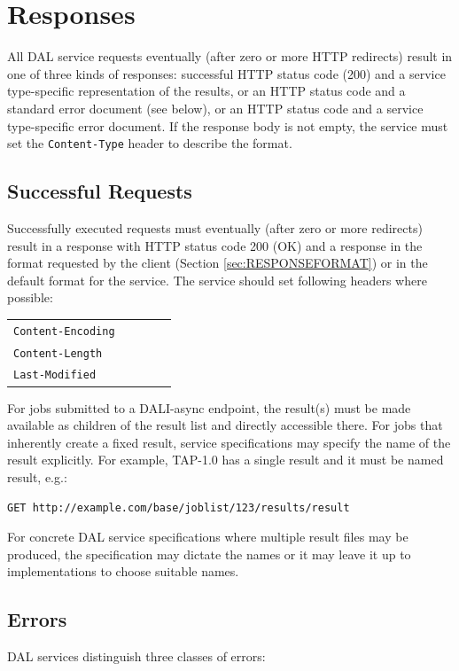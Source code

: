 \documentclass[11pt,letter]{ivoa}
\begin{document}
\section{Responses}
\label{sec:responses}
All DAL service requests eventually (after zero or more HTTP redirects) result
in one of three kinds of responses:
successful HTTP status code (200) and a service type-specific
representation of the results, or an HTTP status code and a standard error
document (see below), or an HTTP status code and a service type-specific
error document. If the response body is not empty, the service must set the
\verb|Content-Type| header \citep{std:HTTP} to describe the format.

\subsection{Successful Requests}
\label{sec:response-ok}
Successfully executed requests must eventually (after zero or more redirects)
result in a response with HTTP status code 200 (OK) and a response in the format
requested by the client (Section \ref{sec:RESPONSEFORMAT}) or in the default format for the
service. The service should set following headers where possible:

\begin{tabular}{l l l l l}
\label{tab:headers}
\verb|Content-Encoding| \\
\verb|Content-Length| \\
\verb|Last-Modified| \\
\end{tabular}

For jobs submitted to a DALI-async endpoint, the result(s) must be made
available as children of the result list and directly accessible there.
For jobs that inherently create a fixed result, service specifications may
specify the name of the result explicitly. For example, TAP-1.0 has a single
result and it must be named result, e.g.:

\begin{verbatim}
GET http://example.com/base/joblist/123/results/result
\end{verbatim}

For concrete DAL service specifications where multiple result files may be
produced, the specification may dictate the names or it may leave it up to
implementations to choose suitable names.

\subsection{Errors}
\label{sec:response-error}
DAL services distinguish three classes of errors:
\end{document}
